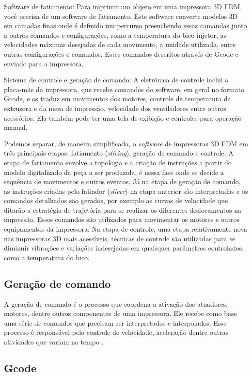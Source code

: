 Software de fatiamento: Para imprimir um objeto em uma impressora 3D FDM, você precisa de um software de fatiamento. 
Este software converte modelos 3D em camadas finas onde é definido um percurso preenchendo essas camandas junto
a outros comandos e configurações, como a temperatura do bico injetor, as velocidades máximas desejadas de cada movimento,
a unidade utilizada, entre outras configurações e comandos. Estes comandos descritos através de Gcode e enviado para a impressora. 

Sistema de controle e geração de comando: A eletrônica de controle inclui a placa-mãe da impressora, que recebe comandos do 
software, em geral no formato Gcode, e os traduz em movimentos dos motores, controle de temperatura da extrusora e da mesa de impressão, 
velocidade dos ventiladores entre outros acessórios. 
Ela também pode ter uma tela de exibição e controles para operação manual.

Podemos separar, de maneira simplificada, o \textit{software} de impressoras 3D
FDM em três principais etapas: fatiamento (\textit{slicing}), geração de comando e controle.
A etapa de fatiamento envolve a topologia e a criação de instruções a partir do modelo digitalizado da peça a ser produzida,
é nessa fase onde se decide a sequência de movimentos e outros eventos.
Já na etapa de geração de comando, as instruções criadas pelo fatiador (\textit{slicer}) na etapa anterior
são interpretadas e os comandos detalhados são gerados, por exemplo as curvas de velocidade que ditarão a 
estratégia de trajetória para se realizar os diferentes deslocamentos na impressão.
Esses comandos são utilizados para movimentar os motores e outros equipamentos da impressora.
Na etapa de controle, uma etapa relativamente nova nas impressoras 3D mais acessíveis, 
técnicas de controle são utilizadas para se diminuir vibrações e variações indesejadas em quaisquer
parâmetros controlados, como a temperatura do bico.

\subsection{Geração de comando}
A geração de comando é o processo que coordena a ativação dos 
atuadores, motores, dentre outros componentes de uma impressora. 
Ele recebe como base uma série de comandos que precisam ser 
interpretados e interpolados. Esse processo é responsável pelo 
controle de velocidade, aceleração dentre outras atividades que 
variam no tempo \cite{yu20}. 

\subsection{Gcode}

